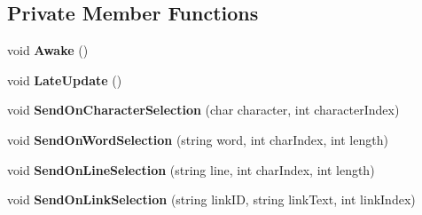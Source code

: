 \subsection*{Private Member Functions}
\begin{DoxyCompactItemize}
\item 
\mbox{\label{class_t_m_pro_1_1_t_m_p___text_event_handler_a79d79a41bd144ead1a7920503c0ed768}} 
void {\bfseries Awake} ()
\item 
\mbox{\label{class_t_m_pro_1_1_t_m_p___text_event_handler_a1b1c0ef737dddbb025de1a210fca24bd}} 
void {\bfseries Late\+Update} ()
\item 
\mbox{\label{class_t_m_pro_1_1_t_m_p___text_event_handler_a326ef15970fea3bb9691b0a4fdb60208}} 
void {\bfseries Send\+On\+Character\+Selection} (char character, int character\+Index)
\item 
\mbox{\label{class_t_m_pro_1_1_t_m_p___text_event_handler_a6cec7c095a4e67726fa8da75b2969711}} 
void {\bfseries Send\+On\+Word\+Selection} (string word, int char\+Index, int length)
\item 
\mbox{\label{class_t_m_pro_1_1_t_m_p___text_event_handler_a4901e4c06758822083e3b96929c27567}} 
void {\bfseries Send\+On\+Line\+Selection} (string line, int char\+Index, int length)
\item 
\mbox{\label{class_t_m_pro_1_1_t_m_p___text_event_handler_a1d348fabb96666271c432640f4247345}} 
void {\bfseries Send\+On\+Link\+Selection} (string link\+ID, string link\+Text, int link\+Index)
\end{DoxyCompactItemize}

